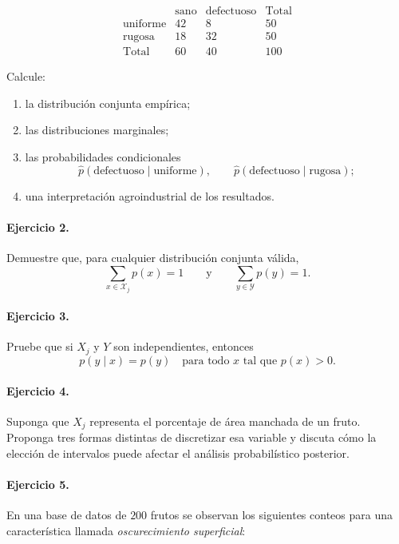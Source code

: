 \documentclass{article}
\begin{document}
\[
\begin{array}{c|cc|c}
 & \text{sano} & \text{defectuoso} & \text{Total} \\
\hline
\text{uniforme} & 42 & 8 & 50 \\
\text{rugosa} & 18 & 32 & 50 \\
\hline
\text{Total} & 60 & 40 & 100
\end{array}
\]

Calcule:

\begin{enumerate}
\item la distribución conjunta empírica;
\item las distribuciones marginales;
\item las probabilidades condicionales
\[
\widehat{p}(\text{defectuoso}\mid \text{uniforme}), \qquad
\widehat{p}(\text{defectuoso}\mid \text{rugosa});
\]
\item una interpretación agroindustrial de los resultados.
\end{enumerate}

\paragraph{Ejercicio 2.}
Demuestre que, para cualquier distribución conjunta válida,
\[
\sum_{x\in\mathcal{X}_j} p(x)=1
\qquad \text{y} \qquad
\sum_{y\in\mathcal{Y}} p(y)=1.
\]

\paragraph{Ejercicio 3.}
Pruebe que si \(X_j\) y \(Y\) son independientes, entonces
\[
p(y\mid x)=p(y)
\quad \text{para todo } x \text{ tal que } p(x)>0.
\]

\paragraph{Ejercicio 4.}
Suponga que \(X_j\) representa el porcentaje de área manchada de un fruto. Proponga tres formas distintas de discretizar esa variable y discuta cómo la elección de intervalos puede afectar el análisis probabilístico posterior.

\paragraph{Ejercicio 5.}
En una base de datos de \(200\) frutos se observan los siguientes conteos para una característica llamada \emph{oscurecimiento superficial}:
\end{document}
